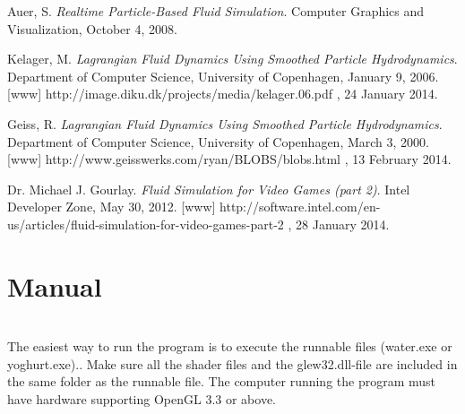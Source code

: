 \documentclass[a4paper,12pt,twoside,final]{report}
\begin{document}




\begin{thebibliography}{11}

  Auer, S.
  \emph{Realtime Particle-Based Fluid Simulation}.
  Computer Graphics and Visualization,
  October 4,
  2008.
  
  Kelager, M.
  \emph{Lagrangian Fluid Dynamics Using Smoothed Particle Hydrodynamics}.
  Department of Computer Science, University of Copenhagen,
  January 9,
  2006.
  [www] http://image.diku.dk/projects/media/kelager.06.pdf , 24 January 2014.
  
  Geiss, R.
  \emph{Lagrangian Fluid Dynamics Using Smoothed Particle Hydrodynamics}.
  Department of Computer Science, University of Copenhagen,
  March 3,
  2000.
  [www] http://www.geisswerks.com/ryan/BLOBS/blobs.html , 13 February 2014.
  
    Dr. Michael J. Gourlay.
  \emph{Fluid Simulation for Video Games (part 2)}.
  Intel Developer Zone,
  May 30,
  2012.
  [www] http://software.intel.com/en-us/articles/fluid-simulation-for-video-games-part-2 , 28 January 2014.
  
\end{thebibliography}

\newpage


\appendix
\chapter{Manual}
 \\
\noindent The easiest way to run the program is to execute the runnable files (water.exe or yoghurt.exe).. Make sure all the shader files and the glew32.dll-file are included in the same folder as the runnable file. The computer running the program must have hardware supporting OpenGL 3.3 or above.
\end{document}

